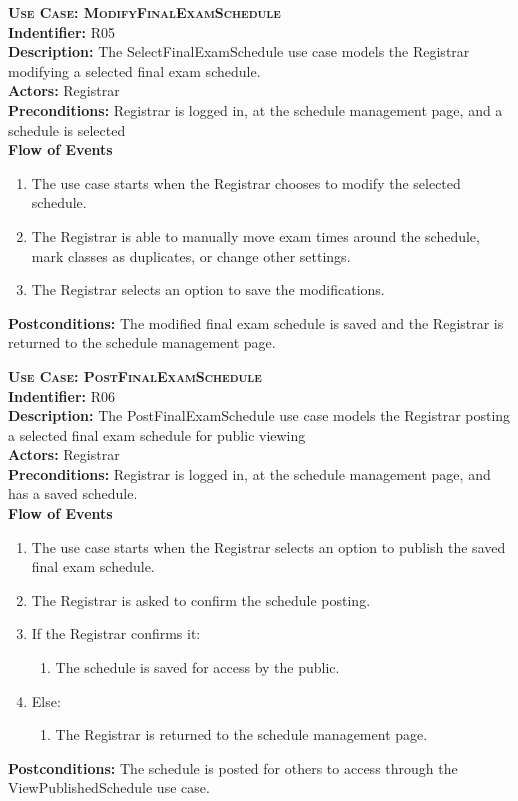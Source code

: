 \documentclass[11pt]{article}
\newenvironment{usecase}{%
	\def\title##1{ {\large \bfseries  \scshape {Use Case:} ##1} \\ }
 	\def\id##1{{\bf Indentifier:} ##1\\}
	\def\des##1{ {\bf Description:} ##1\\}
	\def\actors##1{ {\bf Actors:} ##1\\}
    	\def\pre##1{ {\bf Preconditions:} ##1 \\} %
    	\def\flow##1{ {\bf Flow of Events} ##1}%
    	\newenvironment{ucenum}{%
        	\begin{enumerate}[nolistsep]\small}%
        	{\end{enumerate}}
	\def\post##1{ {\bf Postconditions:} ##1 \\}
}{\vspace{.05in}}
\begin{document}
\begin{usecase}
  \title{ModifyFinalExamSchedule}
  \id{R05}
  \des{The SelectFinalExamSchedule use case models the Registrar modifying a selected final exam schedule.}
  \actors{Registrar}
  \pre{Registrar is logged in, at the schedule management page, and a schedule is selected}
  \flow{}
  \begin{ucenum}
  \item The use case starts when the Registrar chooses to modify the selected schedule.
  \item The Registrar is able to manually move exam times around the schedule, mark classes as duplicates, or change other settings.
  \item The Registrar selects an option to save the modifications.
  \end{ucenum}
  \post{The modified final exam schedule is saved and the Registrar is returned to the schedule management page.}
\end{usecase}

\begin{usecase}
  \title{PostFinalExamSchedule}
  \id{R06}
  \des{The PostFinalExamSchedule use case models the Registrar posting a selected final exam schedule for public viewing}
  \actors{Registrar}
  \pre{Registrar is logged in, at the schedule management page, and has a saved schedule.}
  \flow{}
  \begin{ucenum}
  \item The use case starts when the Registrar selects an option to publish the saved final exam schedule.
  \item The Registrar is asked to confirm the schedule posting.
  \item If the Registrar confirms it:
    \begin{ucenum} \item The schedule is saved for access by the public. \end{ucenum}
  \item Else:
    \begin{ucenum} \item The Registrar is returned to the schedule management page. \end{ucenum}
  \end{ucenum}
  \post{The schedule is posted for others to access through the ViewPublishedSchedule use case.}
\end{usecase}
\end{document}
